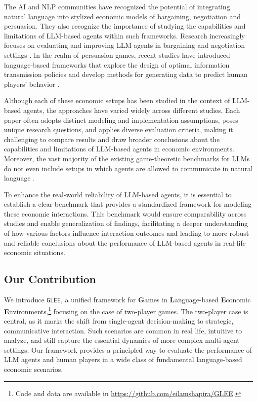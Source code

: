 The AI and NLP communities have recognized the potential of integrating natural language into stylized economic models of bargaining, negotiation and persuasion. They also recognize the importance of studying the capabilities and limitations of LLM-based agents within such frameworks. 
Research increasingly focuses on evaluating and improving LLM agents in bargaining and negotiation settings \cite{abdelnabi2023llm,deng2024llms,xia2024measuring,bianchi2024well,noh2024llms,hua2024game}. In the realm of persuasion games, recent studies have introduced language-based frameworks that explore the design of optimal information transmission policies \cite{raifer2022designing} and develop methods for generating data to predict human players' behavior \cite{apel2022predicting,shapira2025human,shapira2024can}.

Although each of these economic setups has been studied in the context of LLM-based agents, the approaches have varied widely across different studies. Each paper often adopts distinct modeling and implementation assumptions, poses unique research questions, and applies diverse evaluation criteria, making it challenging to compare results and draw broader conclusions about the capabilities and limitations of LLM-based agents in economic environments. 
Moreover, the vast majority of the existing game-theoretic benchmarks for LLMs do not even include setups in which agents are allowed to communicate in natural language \cite{duan2024gtbench,huang2024far,guo2024economics,wang2024tmgbench}.

To enhance the real-world reliability of LLM-based agents, it is essential to establish a clear benchmark that provides a standardized framework for modeling these economic interactions. This benchmark would ensure comparability across studies and enable generalization of findings, facilitating a deeper understanding of how various factors influence interaction outcomes and leading to more robust and reliable conclusions about the performance of LLM-based agents in real-life economic situations.

\subsection{Our Contribution} 

We introduce \texttt{GLEE},
a unified framework for \textbf{G}ames in \textbf{L}anguage-based \textbf{E}conomic \textbf{E}nvironments,\footnote{Code and data are available in  \url{https://github.com/eilamshapira/GLEE}.}
focusing on the case of two-player games.
The two-player case is central, as it marks the shift from single-agent decision-making to strategic, communicative interaction. Such scenarios are common in real life, intuitive to analyze, and still capture the essential dynamics of more complex multi-agent settings.
Our framework provides a principled way to evaluate the performance of LLM agents and human players in a wide class of fundamental language-based economic scenarios. 

